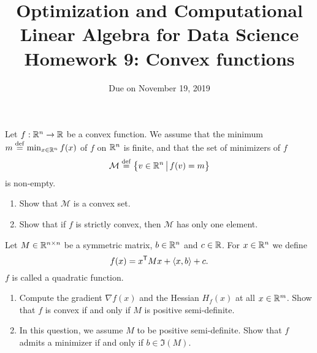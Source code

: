 \documentclass[11pt,nocut]{article}
\title{\vspace{-2.0cm}%
	Optimization and Computational Linear Algebra for Data Science\\
Homework 9: Convex functions}
\date{\vspace{-1cm}Due on November 19, 2019}
\begin{document}
\maketitle



\vspace{4mm}

\begin{problem}[2 points]
	Let $f: \mathbb{R}^n \to \mathbb{R}$ be a convex function. We assume that the minimum $m \overset{\rm def}{=} \min_{x \in \mathbb{R}^n} f(x)$ of $f$ on $\mathbb{R}^n$ is finite, and that the set of minimizers of $f$
$$
\mathcal{M} \overset{\rm def}{=} \big\{ v \in \mathbb{R}^n \, \big| \, f(v) = m \big\}
$$
is non-empty.

	\begin{enumerate}[label=\normalfont(\textbf{\alph*})]
		\item Show that $\mathcal{M}$ is a convex set.
		\item Show that if $f$ is strictly convex, then $\mathcal{M}$ has only one element.
	\end{enumerate}

\end{problem}

\vspace{4mm}

\begin{problem}[2 points]
	Let $M \in \mathbb{R}^{n \times n}$ be a symmetric matrix, $b \in \mathbb{R}^n$ and $c \in \mathbb{R}$.
	For $x \in \mathbb{R}^n$ we define
	$$
	f(x) = x^{{\sf T}} M x + \langle x,b \rangle + c.
	$$
	$f$ is called a quadratic function.
	\begin{enumerate}[label=\normalfont(\textbf{\alph*})]
		\item Compute the gradient $\nabla f(x)$ and the Hessian $H_f(x)$ at all $x \in \mathbb{R}^m$. Show that $f$ is convex if and only if $M$ is positive semi-definite.
		\item In this question, we assume $M$ to be positive semi-definite. Show that $f$ admits a minimizer if and only if $b \in \Im(M)$.
	\end{enumerate}
\end{problem}

\newpage
\end{document}

